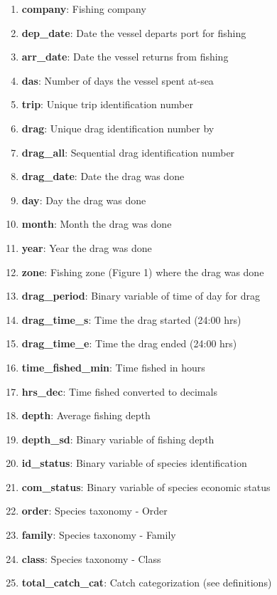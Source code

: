 \documentclass[
]{book}
\providecommand{\tightlist}{%
  \setlength{\itemsep}{0pt}\setlength{\parskip}{0pt}}
\begin{document}
\begin{enumerate}
\def\labelenumi{\arabic{enumi}.}
\tightlist
\item
  \textbf{company}: Fishing company
\item
  \textbf{dep\_date}: Date the vessel departs port for fishing
\item
  \textbf{arr\_date}: Date the vessel returns from fishing
\item
  \textbf{das}: Number of days the vessel spent at-sea\\
\item
  \textbf{trip}: Unique trip identification number
\item
  \textbf{drag}: Unique drag identification number by
\item
  \textbf{drag\_all}: Sequential drag identification number
\item
  \textbf{drag\_date}: Date the drag was done
\item
  \textbf{day}: Day the drag was done
\item
  \textbf{month}: Month the drag was done
\item
  \textbf{year}: Year the drag was done
\item
  \textbf{zone}: Fishing zone (Figure 1) where the drag was done
\item
  \textbf{drag\_period}: Binary variable of time of day for drag
\item
  \textbf{drag\_time\_s}: Time the drag started (24:00 hrs)
\item
  \textbf{drag\_time\_e}: Time the drag ended (24:00 hrs)
\item
  \textbf{time\_fished\_min}: Time fished in hours
\item
  \textbf{hrs\_dec}: Time fished converted to decimals
\item
  \textbf{depth}: Average fishing depth
\item
  \textbf{depth\_sd}: Binary variable of fishing depth
\item
  \textbf{id\_status}: Binary variable of species identification
\item
  \textbf{com\_status}: Binary variable of species economic status
\item
  \textbf{order}: Species taxonomy - Order
\item
  \textbf{family}: Species taxonomy - Family
\item
  \textbf{class}: Species taxonomy - Class
\item
  \textbf{total\_catch\_cat}: Catch categorization (see definitions)

\end{enumerate}
\end{document}
